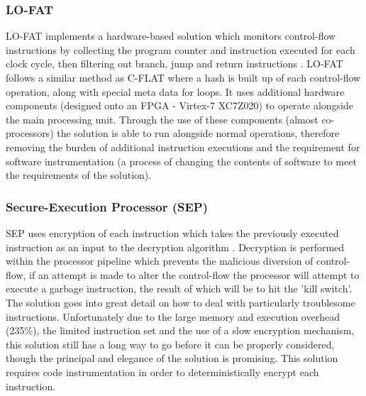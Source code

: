 \subsubsection*{LO-FAT}
LO-FAT implements a hardware-based solution which monitors control-flow instructions by collecting the program counter and instruction executed for each clock cycle, then filtering out branch, jump and return instructions \cite{Dessouky2017}. LO-FAT follows a similar method as C-FLAT where a hash is built up of each control-flow operation, along with special meta data for loops. It uses additional hardware components (designed onto an FPGA - Virtex-7 XC7Z020) to operate alongside the main processing unit. Through the use of these components (almost co-processors) the solution is able to run alongside normal operations, therefore removing the burden of additional instruction executions and the requirement for software instrumentation (a process of changing the contents of software to meet the requirements of the solution).

\subsubsection*{Secure-Execution Processor (SEP)}
SEP uses encryption of each instruction which takes the previously executed instruction as an input to the decryption algorithm \cite{Lee2019}. Decryption is performed within the processor pipeline which prevents the malicious diversion of control-flow, if an attempt is made to alter the control-flow the processor will attempt to execute a garbage instruction, the result of which will be to hit the 'kill switch'. The solution goes into great detail on how to deal with particularly troublesome instructions. Unfortunately due to the large memory and execution overhead (235\%), the limited instruction set and the use of a slow encryption mechanism, this solution still has a long way to go before it can be properly considered, though the principal and elegance of the solution is promising. This solution requires code instrumentation in order to deterministically encrypt each instruction.

